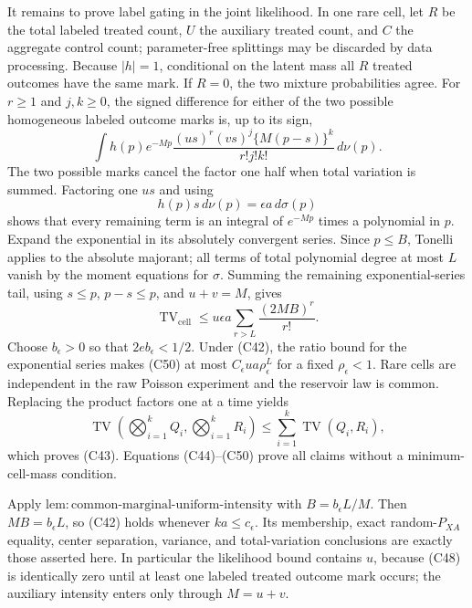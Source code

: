 It remains to prove label gating in the joint likelihood.  In one rare cell, let \(R\) be the total labeled treated count, \(U\) the auxiliary treated count, and \(C\) the aggregate control count; parameter-free splittings may be discarded by data processing.  Because \(|h|=1\), conditional on the latent mass all \(R\) treated outcomes have the same mark.  If \(R=0\), the two mixture probabilities agree.  For \(r\ge1\) and \(j,k\ge0\), the signed difference for either of the two possible homogeneous labeled outcome marks is, up to its sign,
\[
 \int h(p)e^{-Mp}\frac{(us)^r(vs)^j\{M(p-s)\}^k}{r!j!k!}\,d\nu(p). \tag{C48}
\]
The two possible marks cancel the factor one half when total variation is summed.  Factoring one \(us\) and using
\[
 h(p)s\,d\nu(p)=\epsilon a\,d\sigma(p)                             \tag{C49}
\]
shows that every remaining term is an integral of \(e^{-Mp}\) times a polynomial in \(p\).  Expand the exponential in its absolutely convergent series.  Since \(p\le B\), Tonelli applies to the absolute majorant; all terms of total polynomial degree at most \(L\) vanish by the moment equations for \(\sigma\).  Summing the remaining exponential-series tail, using \(s\le p\), \(p-s\le p\), and \(u+v=M\), gives
\[
 \operatorname{TV}_{\mathrm{cell}}
 \le u\epsilon a\sum_{r>L}\frac{(2MB)^r}{r!}.                     \tag{C50}
\]
Choose \(b_\epsilon>0\) so that \(2eb_\epsilon<1/2\).  Under (C42), the ratio bound for the exponential series makes (C50) at most \(C_\epsilon ua\rho_\epsilon^L\) for a fixed \(\rho_\epsilon<1\).  Rare cells are independent in the raw Poisson experiment and the reservoir law is common.  Replacing the product factors one at a time yields
\[
 \operatorname{TV}\!\left(\bigotimes_{i=1}^kQ_i,\bigotimes_{i=1}^kR_i\right)
 \le\sum_{i=1}^k\operatorname{TV}(Q_i,R_i),
\]
which proves (C43).  Equations (C44)--(C50) prove all claims without a minimum-cell-mass condition.

Apply \(\mathrm{lem:common\mbox{-}marginal\mbox{-}uniform\mbox{-}intensity}\) with \(B=b_\epsilon L/M\).  Then \(MB=b_\epsilon L\), so (C42) holds whenever \(ka\le c_\epsilon\).  Its membership, exact random-\(P_{XA}\) equality, center separation, variance, and total-variation conclusions are exactly those asserted here.  In particular the likelihood bound contains \(u\), because (C48) is identically zero until at least one labeled treated outcome mark occurs; the auxiliary intensity enters only through \(M=u+v\).

